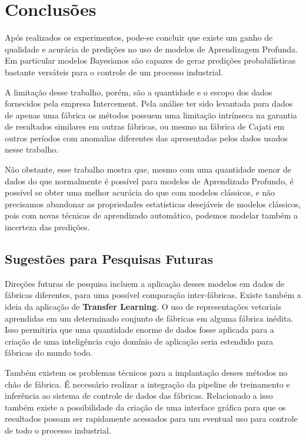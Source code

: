 \chapter{Conclusões}
\label{cap:conclusoes}


Após realizados os experimentos, pode-se concluir que existe um ganho de
qualidade e acurácia de predições no uso de modelos de Aprendizagem
Profunda. Em particular modelos Bayesianos são capazes de gerar predições
probabilísticas bastante versáteis para o controle de um processo industrial.

A limitação desse trabalho, porém, são a quantidade e o escopo dos dados
fornecidos pela empresa Intercement. Pela análise ter sido levantada para dados
de apenas uma fábrica os métodos possuem uma limitação intrínseca na garantia de
resultados similares em outras fábricas, ou mesmo na fábrica de Cajati em
outros períodos com anomalias diferentes das apresentadas pelos dados usados
nesse trabalho.

Não obstante, esse trabalho mostra que, mesmo com uma quantidade menor de dados
do que normalmente é possível para modelos de Aprendizado Profundo, é possível
se obter uma melhor acurácia do que com modelos clássicos, e não precisamos
abandonar as propriedades estatísticas desejáveis de modelos clássicos, pois com
novas técnicas de aprendizado automático, podemos modelar também a incerteza das predições.


\section{Sugestões para Pesquisas Futuras} 

Direções futuras de pesquisa incluem a aplicação desses modelos em dados
de fábricas diferentes, para uma possível comparação inter-fábricas. Existe
também a ideia da aplicação de \textbf{Transfer Learning}. O uso de
representações vetoriais aprendidas em um determinado conjunto de fábricas em
alguma fábrica inédita. Isso permitiria que uma quantidade enorme de dados fosse
aplicada para a criação de uma inteligência cujo domínio de aplicação seria
estendido para fábricas do mundo todo. 

Também existem os problemas técnicos para a implantação desses métodos no chão
de fábrica. É necessário realizar a integração da pipeline de treinamento e inferência ao sistema de
controle de dados das fábricas. Relacionado a isso também existe a possibilidade
da criação de uma interface gráfica para que os resultados possam ser rapidamente acessados
para um eventual uso para controle de todo o processo industrial. 


